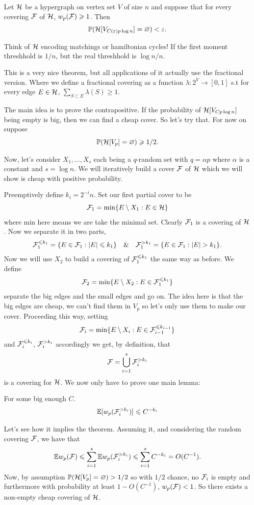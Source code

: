 \begin{theorem}
	Let $\mathcal{H}$ be a hypergraph on vertex set $V$ of size $n$ and suppose
	that for every covering $\mathcal{F}$ of $\mathcal{H}$,
	$w_p(\mathcal{F}) \geqslant 1$. Then
	\[
		\mathbb{P}(\mathcal{H}[V_{C(\varepsilon)p\log n}] = \varnothing) < \varepsilon.
	\]
\end{theorem}

\begin{remark}
	Think of $\mathcal{H}$ encoding matchings or hamiltonian cycles! If the
	first moment threshhold is $1/n$,
	but the real threshhold is $\log n / n$.
\end{remark}

\begin{remark}
	This is a very nice theorem, but all applications of it actually use
	the fractional version.
	Where we define a fractional covering as a function $\lambda : 2^{V} \to [0,1]$
	s.t for every edge $E \in \mathcal{H}$, $\sum_{S \subset E} \lambda(S) \geq 1$.
\end{remark}

The main idea is to prove the contrapositive. If the probability of
$\mathcal{H}[V_{Cp\log n}]$ being empty
is big, then we can find a cheap cover. So let's try that. For now on suppose
\[
	\mathbb{P}(\mathcal{H}[V_p] = \varnothing) \geqslant 1/2.
\]

Now, let's consider $X_1, \dots, X_s$ each being a $q$-random set
with $q = \alpha p$ where $\alpha$
is a constant and $s = \log n$. We will iteratively build a cover $\mathcal{F}$ of $\mathcal{H}$
which we will show is cheap with positive probability.

Preemptively define  $k_i = 2^{-i}n$. Set our first partial cover to be
\[
	\mathcal{F}_1 = \min \{E \setminus X_1 : E \in \mathcal{H}\}
\]
where min here means we are take the minimal set.
Clearly $\mathcal{F}_1$ is a covering of $\mathcal{H}$. Now we separate it in two parts,
\[
	\mathcal{F}_1^{\leqslant k_1} = \{E \in \mathcal{F}_1 : |E| \leqslant k_1\} \quad \& \quad
	\mathcal{F}_1^{>k_1} = \{E \in \mathcal{F}_1 : |E| > k_1\}.
\]
Now we will use $X_2$ to build a covering of $\mathcal{F}_1^{\leqslant k_1}$ the
same way as before. We define
\[
	\mathcal{F}_2 = \min \{E \setminus X_2 : E \in \mathcal{F}_1^{\leqslant k_1}\}
\]
separate the big edges and the small edges and go on. The idea here
is that the big edges are cheap,
we can't find them in $V_p$ so let's only use them to make our cover.
Proceeding this way,
setting
\[
	\mathcal{F}_i = \min \{E \setminus X_i : E \in \mathcal{F}_{i-1}^{\leqslant k_{i-1}}\}
\]
and $\mathcal{F}_i^{\leqslant k_i}$, $\mathcal{F}_i^{> k_i}$ accordingly we get, by definition, that
\[ \mathcal{F} = \bigcup_{i = 1}^s \mathcal{F}_i^{>k_i}\]
is a covering for $\mathcal{H}$. We now only have to prove one main lemma:
\begin{lemma}
	For some big enough $C$.
	\[
		\mathbb{E}[w_p(\mathcal{F}_i^{>k_i})] \leqslant C^{-k_i}
	\]
\end{lemma}
Let's see how it implies the theorem.
Assuming it, and considering the random covering $\mathcal{F}$, we have that
\[
	\mathbb{E} w_p(\mathcal{F}) \leqslant \sum_{i = 1}^s \mathbb{E} w_p(\mathcal{F}_i^{> k_i}) \leqslant \sum_{i
	= 1}^s C^{-k_i} = O(C^{-1}).
\]
Now, by assumption $\mathbb{P}(\mathcal{H}[V_p] = \varnothing) > 1/2$ so with $1/2$ chance,
no $\mathcal{F}_i$ is empty and furthermore with probability at least
$1 - O(C^{-1})$, $w_p(\mathcal{F}) < 1$. So there exists a non-empty cheap
covering of $\mathcal{H}$.

